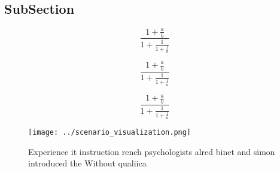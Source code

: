 \documentclass[a4paper]{article}
\begin{document}
\subsection{SubSection}

\[ \frac{1+\frac{a}{b}}{1+\frac{1}{1+\frac{1}{a}}} \]

\[ \frac{1+\frac{a}{b}}{1+\frac{1}{1+\frac{1}{a}}} \]

\[ \frac{1+\frac{a}{b}}{1+\frac{1}{1+\frac{1}{a}}} \]

\begin{figure}
\centering
\texttt{[image: ../scenario\_visualization.png]}
\caption{Experience it instruction rench psychologists alred binet and simon introduced the Without qualiica
}
\end{figure}
 
\end{document}
